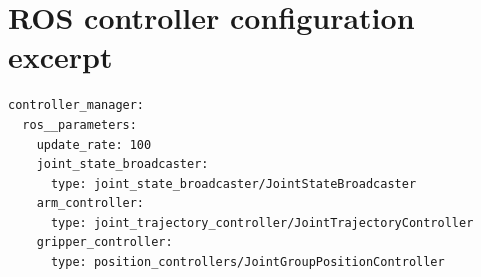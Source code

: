 \section{ROS controller configuration excerpt}
\begin{lstlisting}[caption={Actual interface choices from ros2\_controllers.yaml.}]
controller_manager:
  ros__parameters:
    update_rate: 100
    joint_state_broadcaster:
      type: joint_state_broadcaster/JointStateBroadcaster
    arm_controller:
      type: joint_trajectory_controller/JointTrajectoryController
    gripper_controller:
      type: position_controllers/JointGroupPositionController
\end{lstlisting}
